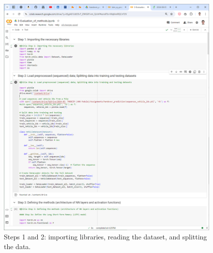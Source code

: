 \documentclass[journal,onecolumn]{IEEEtran}
\begin{document}
{\begin{appendices}
\begin{figure}
    \centering
    \includegraphics[width=0.99\linewidth]{figures/scr-1-colab.png}
    \caption{Steps 1 and 2: importing libraries, reading the dataset, and splitting the data.}
    \label{fig:scr-1-colab}
\end{figure}


\end{appendices}}
\end{document}
